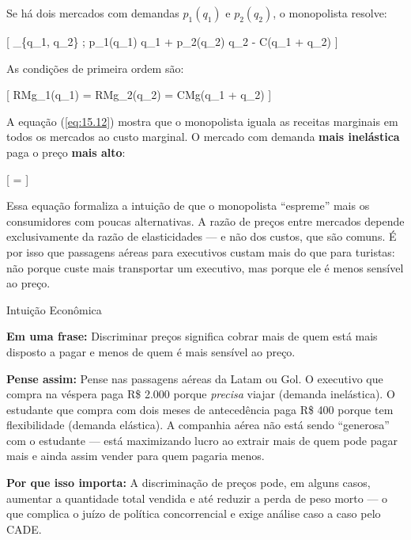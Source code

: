 \documentclass[11pt,twoside,openright]{book}
\begin{document}
Se há dois mercados com demandas \(p_1(q_1)\) e \(p_2(q_2)\), o
monopolista resolve:

{[} \max\_\{q\_1, q\_2\} ; p\_1(q\_1) \cdot q\_1 + p\_2(q\_2) \cdot q\_2
- C(q\_1 + q\_2) {]}

As condições de primeira ordem são:

{[} RMg\_1(q\_1) = RMg\_2(q\_2) = CMg(q\_1 + q\_2) \label{eq:15.12}
 {]}

A equação (\ref{eq:15.12}) mostra que o monopolista iguala as receitas
marginais em todos os mercados ao custo marginal. O mercado com demanda
\textbf{mais inelástica} paga o preço \textbf{mais alto}:

{[}  =
\label{eq:15.13}  {]}

Essa equação formaliza a intuição de que o monopolista ``espreme'' mais
os consumidores com poucas alternativas. A razão de preços entre
mercados depende exclusivamente da razão de elasticidades --- e não dos
custos, que são comuns. É por isso que passagens aéreas para executivos
custam mais do que para turistas: não porque custe mais transportar um
executivo, mas porque ele é menos sensível ao preço.

\begin{intuitionbox}{Intuição Econômica}

\textbf{Em uma frase:} Discriminar preços significa cobrar mais de quem
está mais disposto a pagar e menos de quem é mais sensível ao preço.

\textbf{Pense assim:} Pense nas passagens aéreas da Latam ou Gol. O
executivo que compra na véspera paga R\$ 2.000 porque \emph{precisa}
viajar (demanda inelástica). O estudante que compra com dois meses de
antecedência paga R\$ 400 porque tem flexibilidade (demanda elástica). A
companhia aérea não está sendo ``generosa'' com o estudante --- está
maximizando lucro ao extrair mais de quem pode pagar mais e ainda assim
vender para quem pagaria menos.

\textbf{Por que isso importa:} A discriminação de preços pode, em alguns
casos, aumentar a quantidade total vendida e até reduzir a perda de peso
morto --- o que complica o juízo de política concorrencial e exige
análise caso a caso pelo CADE.

\end{intuitionbox}
\end{document}
